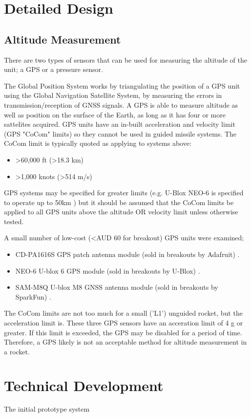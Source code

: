 \documentclass{article}
\begin{document}
\section{Detailed Design}

    \subsection{Altitude Measurement}

        There are two types of sensors that can be used for measuring the altitude of the unit; a GPS or a pressure sensor.

        The Global Position System works by triangulating the position of a GPS unit using the Global Navigation Satellite System, by measuring the errors in transmission/reception of GNSS signals.
        A GPS is able to measure altitude as well as position on the surface of the Earth, as long as it has four or more sattelites acquired.
        GPS units have an in-built acceleration and velocity limit (GPS "CoCom" limits) so they cannot be used in guided missile systems.
        The CoCom limit is typically quoted as applying to systems above:
        \begin{itemize}
            \item >60,000 ft (>18.3 km)
            \item >1,000 knots (>514 m/s)
        \end{itemize}
        GPS systems may be specified for greater limits (e.g. U-Blox NEO-6 is specified to operate up to 50km \cite{ublox-gps1}) but it should be assumed that the CoCom limits be applied to all GPS units above the altitude OR velocity limit unless otherwise tested.

        A small number of low-cost (<AUD 60 for breakout) GPS units were examined;
        \begin{itemize}
            \item CD-PA1616S GPS patch antenna module (sold in breakouts by Adafruit) \cite{cd-gps}.
            \item NEO-6 U-blox 6 GPS module (sold in breakouts by U-Blox) \cite{ublox-gps1}.
            \item SAM-M8Q U-blox M8 GNSS antenna module (sold in breakouts by SparkFun) \cite{ublox-gps2}.
        \end{itemize}

        The CoCom limits are not too much for a small ('L1') unguided rocket, but the acceleration limit is.
        These three GPS sensors have an acceration limit of 4 g or greater.
        If this limit is exceeded, the GPS may be disabled for a period of time.
        Therefore, a GPS likely is not an acceptable method for altitude measurement in a rocket.

\section{Technical Development}

    The initial prototype system



\end{document}
